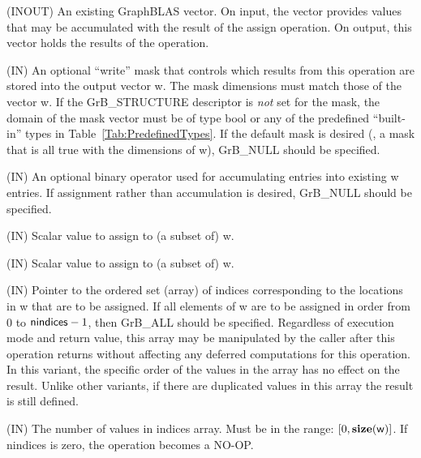 \begin{itemize}[leftmargin=1.1in]
    \item[{\sf w}]    ({\sf INOUT}) An existing GraphBLAS vector.  On input,
    the vector provides values that may be accumulated with the result of the
    assign operation.  On output, this vector holds the results of the
    operation.

    \item[{\sf mask}] ({\sf IN}) An optional ``write'' mask that controls which
    results from this operation are stored into the output vector {\sf w}. The 
    mask dimensions must match those of the vector {\sf w}. If the 
    {\sf GrB\_STRUCTURE} descriptor is {\em not} set for the mask, the domain of the
    {\sf mask} vector must be of type {\sf bool} or any of the predefined 
    ``built-in'' types in Table~\ref{Tab:PredefinedTypes}.  If the default
    mask is desired (\ie, a mask that is all {\sf true} with the dimensions of {\sf w}), 
    {\sf GrB\_NULL} should be specified.

    \item[{\sf accum}] ({\sf IN}) An optional binary operator used for accumulating
    entries into existing {\sf w} entries. If assignment rather than accumulation is
    desired, {\sf GrB\_NULL} should be specified.

    \item[{\sf val}]    ({\sf IN}) Scalar value to assign to (a subset of) {\sf w}.

{\color{red}
    \item[{\sf s}]    ({\sf IN}) Scalar value to assign to (a subset of) {\sf w}.
}

    \item[{\sf indices}]  ({\sf IN}) Pointer to the ordered set (array) of 
    indices corresponding to the locations in {\sf w} that are to be assigned.  
    If all elements of {\sf w} are to be assigned in order from $0$ to 
    ${\sf nindices} - 1$, then {\sf GrB\_ALL} should be specified.  Regardless of 
    execution mode and return value, this array may be manipulated by the caller
    after this operation returns without affecting any deferred computations for 
    this operation.  
    In this variant, the specific order of the values in the
    array has no effect on the result.  Unlike other variants, if there are 
    duplicated values in this array the result is still defined.
    
    \item[{\sf nindices}] ({\sf IN}) The number of values in {\sf indices} array.
    Must be in the range: $[0, \bold{size}({\sf w})]$.  If {\sf nindices}
    is zero, the operation becomes a NO-OP.


\end{itemize}
